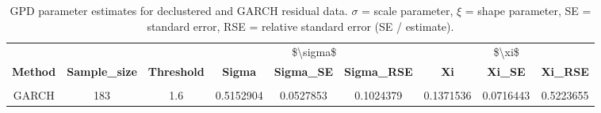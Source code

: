 \begin{table}[!h]
\centering
\caption[GPD parameter estimates for declustered vs GARCH]{GPD parameter estimates for declustered and GARCH residual data. $\sigma$ = scale parameter, $\xi$ = shape parameter, SE = standard error, RSE = relative standard error (SE / estimate).}
\centering
\begin{tabular}[t]{ccccccccc}
\toprule
\multicolumn{3}{c}{ } & \multicolumn{3}{c}{\$\textbackslash{}sigma\$} & \multicolumn{3}{c}{\$\textbackslash{}xi\$} \\
\cmidrule(l{3pt}r{3pt}){4-6} \cmidrule(l{3pt}r{3pt}){7-9}
\textbf{Method} & \textbf{Sample_size} & \textbf{Threshold} & \textbf{Sigma} & \textbf{Sigma_SE} & \textbf{Sigma_RSE} & \textbf{Xi} & \textbf{Xi_SE} & \textbf{Xi_RSE}\\
\midrule
\cellcolor{gray!10}{Declustering} & \cellcolor{gray!10}{94} & \cellcolor{gray!10}{1.1} & \cellcolor{gray!10}{0.4269681} & \cellcolor{gray!10}{0.0647118} & \cellcolor{gray!10}{0.1515612} & \cellcolor{gray!10}{0.1529916} & \cellcolor{gray!10}{0.1121660} & \cellcolor{gray!10}{0.7331516}\\
GARCH & 183 & 1.6 & 0.5152904 & 0.0527853 & 0.1024379 & 0.1371536 & 0.0716443 & 0.5223655\\
\bottomrule
\end{tabular}
\end{table}
